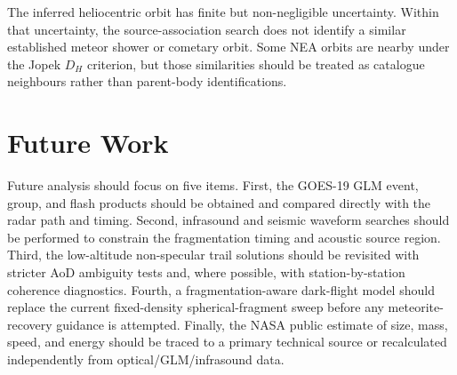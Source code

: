 The inferred heliocentric orbit has finite but non-negligible uncertainty.
Within that uncertainty, the source-association search does not identify a
similar established meteor shower or cometary orbit.  Some NEA orbits are
nearby under the Jopek \(D_H\) criterion, but those similarities should be
treated as catalogue neighbours rather than parent-body identifications.

\section{Future Work}

Future analysis should focus on five items.  First, the GOES-19 GLM event,
group, and flash products should be obtained and compared directly with the
radar path and timing.  Second, infrasound and seismic waveform searches should
be performed to constrain the fragmentation timing and acoustic source region.
Third, the low-altitude non-specular trail solutions should be revisited with
stricter AoD ambiguity tests and, where possible, with station-by-station
coherence diagnostics.  Fourth, a fragmentation-aware dark-flight model should
replace the current fixed-density spherical-fragment sweep before any
meteorite-recovery guidance is attempted.  Finally, the NASA public estimate
of size, mass, speed, and energy should be traced to a primary technical source
or recalculated independently from optical/GLM/infrasound data.
